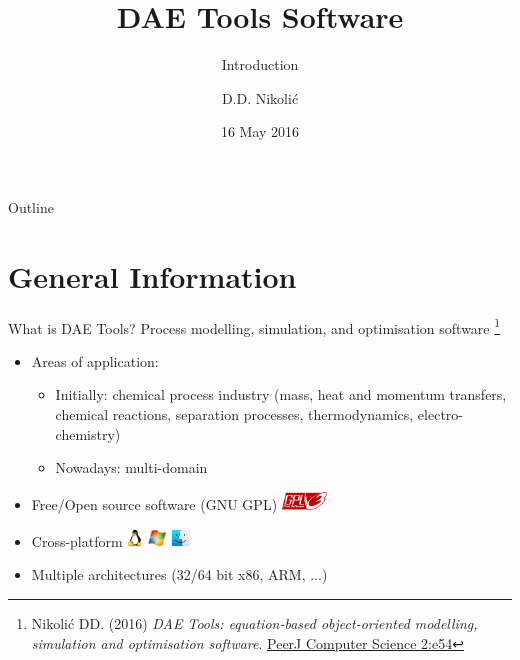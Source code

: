 \documentclass[compress,newPxFont,sthlmFooter]{beamer}
\title{DAE Tools Software}
\subtitle{Introduction}
\author{D.D. Nikolić}
\institute
{
  DAE Tools Project, \url{http://www.daetools.com}
}
\date{16 May 2016}
\begin{document}
\maketitle

\begin{frame}{Outline}
\tableofcontents[sectionstyle=show, 
                 subsectionstyle=hide]
\end{frame} 

\section{General Information}

\begin{frame}{What is DAE Tools?} 
Process \alert{modelling}, \alert{simulation}, and \alert{optimisation} software
\footnote{\tiny{Nikolić DD. (2016) \textit{DAE Tools: equation-based object-oriented modelling, simulation and optimisation software}.
          \href{https://doi.org/10.7717/peerj-cs.54}{PeerJ Computer Science 2:e54}}
         }

\begin{itemize}
  \item Areas of application:
    \begin{itemize}
      \item Initially: \alert{chemical process industry} (mass, heat and momentum transfers, chemical reactions, 
                                                          separation processes, thermodynamics, electro-chemistry)
      \item Nowadays: \alert{multi-domain}
    \end{itemize}
  \item \alert{Free/Open source software} (GNU GPL) \includegraphics[align=c,height=1.3em]{gnu_gpl3.png}
  \item \alert{Cross-platform} \includegraphics[align=c,height=1.3em]{linux.png} 
                               \includegraphics[align=c,height=1.3em]{windows.png} 
                               \includegraphics[align=c,height=1.3em]{macos.png}
  \item \alert{Multiple architectures} (32/64 bit x86, ARM, ...)
\end{itemize}
\end{frame}
\end{document}
